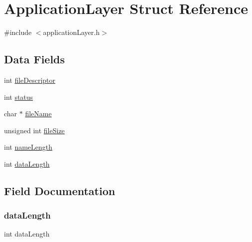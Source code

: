 \hypertarget{struct_application_layer}{}\section{Application\+Layer Struct Reference}
\label{struct_application_layer}


{\ttfamily \#include $<$application\+Layer.\+h$>$}

\subsection*{Data Fields}
\begin{DoxyCompactItemize}
\item 
int \hyperlink{struct_application_layer_a57acc7a88386e5b7723454c0641d68e5}{file\+Descriptor}
\item 
int \hyperlink{struct_application_layer_a6e27f49150e9a14580fb313cc2777e00}{status}
\item 
char $\ast$ \hyperlink{struct_application_layer_a25c8761bc1f523fe6a53db546ae83add}{file\+Name}
\item 
unsigned int \hyperlink{struct_application_layer_a02f75786092d1cb5e26302ec679ac5d8}{file\+Size}
\item 
int \hyperlink{struct_application_layer_a7989274348ad7f470b7b916df6d8b912}{name\+Length}
\item 
int \hyperlink{struct_application_layer_ac50394778872f72e8f5ac69718956b3c}{data\+Length}
\end{DoxyCompactItemize}


\subsection{Field Documentation}
\hypertarget{struct_application_layer_ac50394778872f72e8f5ac69718956b3c}{}\label{struct_application_layer_ac50394778872f72e8f5ac69718956b3c} 
\subsubsection{\texorpdfstring{data\+Length}{dataLength}}
{\footnotesize\ttfamily int data\+Length}

\hypertarget{struct_application_layer_a57acc7a88386e5b7723454c0641d68e5}{}\label{struct_application_layer_a57acc7a88386e5b7723454c0641d68e5} 
